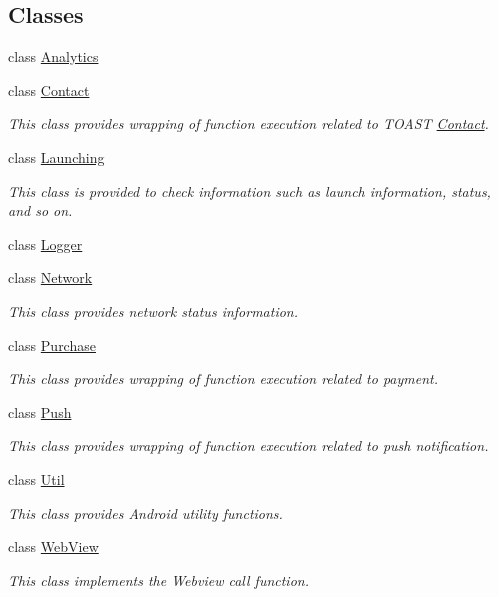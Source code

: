 \subsection*{Classes}
\begin{DoxyCompactItemize}
\item 
class \hyperlink{classcom_1_1toast_1_1android_1_1gamebase_1_1_gamebase_1_1_analytics}{Analytics}
\item 
class \hyperlink{classcom_1_1toast_1_1android_1_1gamebase_1_1_gamebase_1_1_contact}{Contact}
\begin{DoxyCompactList}\small\item\em This class provides wrapping of function execution related to T\+O\+A\+ST \hyperlink{classcom_1_1toast_1_1android_1_1gamebase_1_1_gamebase_1_1_contact}{Contact}. \end{DoxyCompactList}\item 
class \hyperlink{classcom_1_1toast_1_1android_1_1gamebase_1_1_gamebase_1_1_launching}{Launching}
\begin{DoxyCompactList}\small\item\em This class is provided to check information such as launch information, status, and so on. \end{DoxyCompactList}\item 
class \hyperlink{classcom_1_1toast_1_1android_1_1gamebase_1_1_gamebase_1_1_logger}{Logger}
\item 
class \hyperlink{classcom_1_1toast_1_1android_1_1gamebase_1_1_gamebase_1_1_network}{Network}
\begin{DoxyCompactList}\small\item\em This class provides network status information. \end{DoxyCompactList}\item 
class \hyperlink{classcom_1_1toast_1_1android_1_1gamebase_1_1_gamebase_1_1_purchase}{Purchase}
\begin{DoxyCompactList}\small\item\em This class provides wrapping of function execution related to payment. \end{DoxyCompactList}\item 
class \hyperlink{classcom_1_1toast_1_1android_1_1gamebase_1_1_gamebase_1_1_push}{Push}
\begin{DoxyCompactList}\small\item\em This class provides wrapping of function execution related to push notification. \end{DoxyCompactList}\item 
class \hyperlink{classcom_1_1toast_1_1android_1_1gamebase_1_1_gamebase_1_1_util}{Util}
\begin{DoxyCompactList}\small\item\em This class provides Android utility functions. \end{DoxyCompactList}\item 
class \hyperlink{classcom_1_1toast_1_1android_1_1gamebase_1_1_gamebase_1_1_web_view}{Web\+View}
\begin{DoxyCompactList}\small\item\em This class implements the Webview call function. \end{DoxyCompactList}\end{DoxyCompactItemize}
